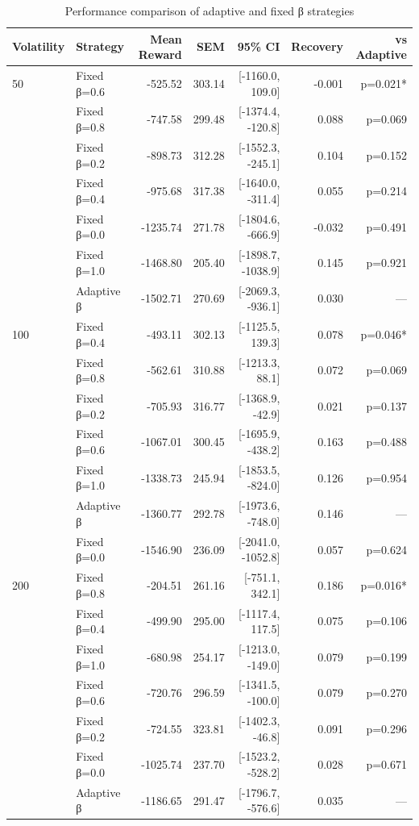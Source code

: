 \begin{table}[htbp]
\centering
\caption{Performance comparison of adaptive and fixed β strategies}
\label{tab:performance}
\begin{tabular}{llrrrrr}
\hline
Volatility & Strategy & Mean Reward & SEM & 95\% CI & Recovery & vs Adaptive \\
\hline
50 & Fixed β=0.6 & -525.52 & 303.14 & [-1160.0, 109.0] & -0.001 & p=0.021* \\
 & Fixed β=0.8 & -747.58 & 299.48 & [-1374.4, -120.8] & 0.088 & p=0.069 \\
 & Fixed β=0.2 & -898.73 & 312.28 & [-1552.3, -245.1] & 0.104 & p=0.152 \\
 & Fixed β=0.4 & -975.68 & 317.38 & [-1640.0, -311.4] & 0.055 & p=0.214 \\
 & Fixed β=0.0 & -1235.74 & 271.78 & [-1804.6, -666.9] & -0.032 & p=0.491 \\
 & Fixed β=1.0 & -1468.80 & 205.40 & [-1898.7, -1038.9] & 0.145 & p=0.921 \\
 & Adaptive β & -1502.71 & 270.69 & [-2069.3, -936.1] & 0.030 & --- \\
\hline
100 & Fixed β=0.4 & -493.11 & 302.13 & [-1125.5, 139.3] & 0.078 & p=0.046* \\
 & Fixed β=0.8 & -562.61 & 310.88 & [-1213.3, 88.1] & 0.072 & p=0.069 \\
 & Fixed β=0.2 & -705.93 & 316.77 & [-1368.9, -42.9] & 0.021 & p=0.137 \\
 & Fixed β=0.6 & -1067.01 & 300.45 & [-1695.9, -438.2] & 0.163 & p=0.488 \\
 & Fixed β=1.0 & -1338.73 & 245.94 & [-1853.5, -824.0] & 0.126 & p=0.954 \\
 & Adaptive β & -1360.77 & 292.78 & [-1973.6, -748.0] & 0.146 & --- \\
 & Fixed β=0.0 & -1546.90 & 236.09 & [-2041.0, -1052.8] & 0.057 & p=0.624 \\
\hline
200 & Fixed β=0.8 & -204.51 & 261.16 & [-751.1, 342.1] & 0.186 & p=0.016* \\
 & Fixed β=0.4 & -499.90 & 295.00 & [-1117.4, 117.5] & 0.075 & p=0.106 \\
 & Fixed β=1.0 & -680.98 & 254.17 & [-1213.0, -149.0] & 0.079 & p=0.199 \\
 & Fixed β=0.6 & -720.76 & 296.59 & [-1341.5, -100.0] & 0.079 & p=0.270 \\
 & Fixed β=0.2 & -724.55 & 323.81 & [-1402.3, -46.8] & 0.091 & p=0.296 \\
 & Fixed β=0.0 & -1025.74 & 237.70 & [-1523.2, -528.2] & 0.028 & p=0.671 \\
 & Adaptive β & -1186.65 & 291.47 & [-1796.7, -576.6] & 0.035 & --- \\
\hline
\end{tabular}
\end{table}

